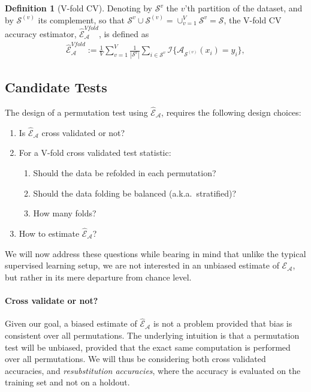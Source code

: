 \documentclass[12pt,a4paper]{article}
\theoremstyle{definition}
\newtheorem{definition}{Definition}
\newcommand{\set}[1]{\{ #1 \}} %
\newcommand{\indicator}[1]{\mathcal{I}{\set{#1}}} %
\newcommand{\features}{x} %
\newcommand{\outcomes}{y} %
\newcommand{\acc}{\mathcal{E}}
\newcommand{\accEstim}{\hat{\mathcal{E}}}
\newcommand{\hypFun}[2]{\algo_{#1}(#2)} %
\newcommand{\algo}{\mathcal{A}}
\newcommand{\data}{\mathcal{S}}
\newcommand{\union}{\cup}
\begin{document}
\begin{definition}[V-fold CV]
\label{def:v-fold}
Denoting by $\data^{v}$ the $v$'th partition of the dataset, and by $\data^{(v)}$ its complement, so that $\data^{v} \union \data^{(v)}=\union_{v=1}^V \data^{v}=\data$, the V-fold CV accuracy estimator, $\accEstim_{\algo}^{Vfold}$, is defined as 	
\begin{align}
	\accEstim_{\algo}^{Vfold} := 
	\frac 1V \sum_{v=1}^{V} \frac{1}{|\data^v|} \sum_{i \in \data^{v}} \indicator{\hypFun{\data^{(v)}}{\features_i}=\outcomes_i}, 
\end{align}
\end{definition}




\subsection{Candidate Tests}
\label{sec:considerations}

The design of a permutation test using $\accEstim_{\algo}$, requires the following design choices: 
\begin{enumerate}
\item Is $\accEstim_{\algo}$ cross validated or not?
\item For a V-fold cross validated test statistic:
\begin{enumerate}
\item Should the data be refolded in each permutation? 
\item Should the data folding be balanced (a.k.a.\ stratified)?
\item How many folds? 
\end{enumerate}
\item How to estimate $\accEstim_{\algo}$?
\end{enumerate}

We will now address these questions while bearing in mind that unlike the typical supervised learning setup, we are not interested in an unbiased estimate of $\acc_{\algo}$, but rather in its mere departure from chance level. 

\paragraph{Cross validate or not?}
Given our goal, a biased estimate of $\accEstim_{\algo}$ is not a problem provided that bias is consistent over all permutations. 
The underlying intuition is that a permutation test will be unbiased, provided that the exact same computation is performed over all permutations. 
We will thus be considering both cross validated accuracies, and \emph{resubstitution accuracies}, where the accuracy is evaluated on the training set and not on a holdout.
\end{document}
